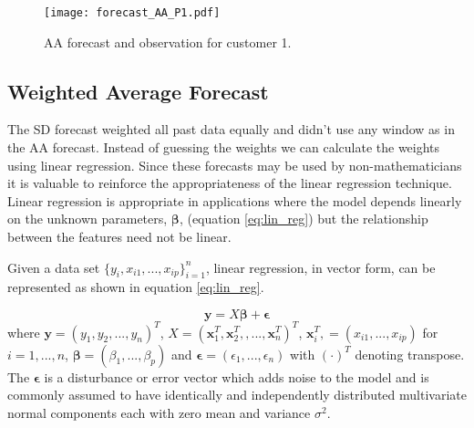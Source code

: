 \begin{figure}
\centering
\texttt{[image: forecast\_AA\_P1.pdf]}
\caption{AA forecast and observation for customer 1.}
\label{fig:AA_forecast_P1} 
\end{figure}

\subsection{Weighted Average Forecast}

The SD forecast weighted all past data equally and didn't use any window as in the AA forecast. Instead of guessing the weights we can calculate the weights using linear regression. Since these forecasts may be used by non-mathematicians it is valuable to reinforce the appropriateness of the linear regression technique. Linear regression is appropriate in applications where the model depends linearly on the unknown parameters, $\boldsymbol \beta$, (equation \ref{eq:lin_reg}) but the relationship between the features need not be linear.

Given a data set $\{y_i, x_{i1}, ... , x_{ip}\}_{i=1}^n$, linear regression, in vector form, can be represented as shown in equation \ref{eq:lin_reg}.

\begin{equation} \label{eq:lin_reg}
\textbf{y} = X \boldsymbol \beta +\boldsymbol \epsilon
\end{equation}
where $\textbf{y} = (y_1, y_2, ... , y_n)^T $, $X =  (\textbf{x}_1^T, \textbf{x}_2^T,, ... ,\textbf{x}_n^T)^T$,  $\textbf{x}_i^T, = (x_{i1}, ... , x_{ip})$ for $i = 1, ... , n$, $\boldsymbol \beta = (\beta_1 , ... , \beta_p)$ and $\boldsymbol \epsilon = (\epsilon_1, ... , \epsilon_n)$ with $( \cdot )^T$ denoting transpose. The $\boldsymbol \epsilon$ is a disturbance or error vector which adds noise to the model and is commonly assumed to have identically and independently distributed multivariate normal components each with zero mean and variance $\sigma^2$.

